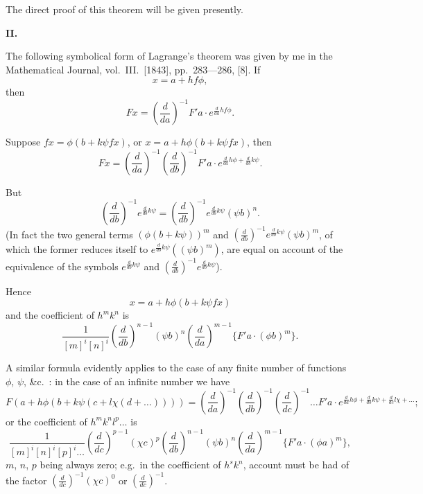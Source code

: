 \documentclass[11pt,a4paper]{article}
\theoremstyle{plain}
\begin{document}
The direct proof of this theorem will be given presently.

\bigskip
\noindent\textbf{II.}

The following symbolical form of Lagrange's theorem was given by me in the Mathematical Journal, vol.\ III.\ [1843], pp.\ 283---286, [8]. If
\begin{equation}
x = a + hf\phi,
\tag{7}
\end{equation}
then
\[ Fx = \left( \frac{d}{da} \right)^{-1} F'a \cdot e^{\frac{d}{da}hf\phi}. \]

Suppose $fx = \phi(b + k\psi fx)$, or $x = a + h\phi(b + k\psi fx)$, then
\[ Fx = \left( \frac{d}{da} \right)^{-1} \left( \frac{d}{db} \right)^{-1} F'a \cdot e^{\frac{d}{da}h\phi + \frac{d}{db}k\psi}. \]

But
\[ \left( \frac{d}{db} \right)^{-1} e^{\frac{d}{db}k\psi} = \left( \frac{d}{db} \right)^{-1} e^{\frac{d}{db}k\psi} (\psi b)^n. \]
(In fact the two general terms $(\phi(b+k\psi))^m$ and $\left( \frac{d}{db} \right)^{-1} e^{\frac{d}{db}k\psi} (\psi b)^m$, of which the former reduces itself to $e^{\frac{d}{db}k\psi}((\psi b)^m)$, are equal on account of the equivalence of the symbols $e^{\frac{d}{db}k\psi}$ and $\left( \frac{d}{db} \right)^{-1} e^{\frac{d}{db}k\psi}$).

Hence
\begin{equation}
x = a + h\phi(b + k\psi fx)
\tag{8}
\end{equation}
and the coefficient of $h^m k^n$ is
\[ \frac{1}{[m]^i [n]^i} \left( \frac{d}{db} \right)^{n-1} (\psi b)^n \left( \frac{d}{da} \right)^{m-1} \{ F'a \cdot (\phi b)^m \}. \]

A similar formula evidently applies to the case of any finite number of functions $\phi$, $\psi$, \&c.\ : in the case of an infinite number we have
\begin{equation}
F(a + h\phi(b + k\psi(c + l\chi(d + \ldots)))) = \left( \frac{d}{da} \right)^{-1} \left( \frac{d}{db} \right)^{-1} \left( \frac{d}{dc} \right)^{-1} \ldots F'a \cdot e^{\frac{d}{da}h\phi + \frac{d}{db}k\psi + \frac{d}{dc}l\chi + \ldots};
\tag{9}
\end{equation}
or the coefficient of $h^m k^n l^p \ldots$ is
\[ \frac{1}{[m]^i [n]^i [p]^i \ldots} \left( \frac{d}{dc} \right)^{p-1} (\chi c)^p \left( \frac{d}{db} \right)^{n-1} (\psi b)^n \left( \frac{d}{da} \right)^{m-1} \{ F'a \cdot (\phi a)^m \}, \]
$m$, $n$, $p$ being always zero; e.g.\ in the coefficient of $h^s k^n$, account must be had of the factor $\left( \frac{d}{dc} \right)^{-1} (\chi c)^0$ or $\left( \frac{d}{dc} \right)^{-1}$.
\end{document}
